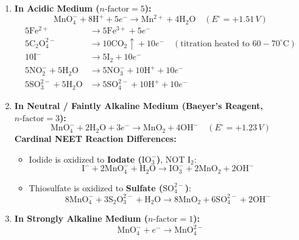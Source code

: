 \documentclass[10pt,twoside,openright]{book}
\begin{document}
\begin{formulabox}
\begin{enumerate}
  \item \textbf{In Acidic Medium ($n\text{-factor} = 5$):}
  \begin{equation}
    \mathrm{MnO_4^-} + 8\mathrm{H^+} + 5e^- \longrightarrow \mathrm{Mn^{2+}} + 4\mathrm{H_2O} \quad (E^\circ = +1.51\,\si{V})
  \end{equation}
  \begin{align}
    5\mathrm{Fe^{2+}} &\longrightarrow 5\mathrm{Fe^{3+}} + 5e^- \\
    5\mathrm{C_2O_4^{2-}} &\longrightarrow 10\mathrm{CO_2\uparrow} + 10e^- \quad (\text{titration heated to } 60-70^\circ\text{C}) \\
    10\mathrm{I^-} &\longrightarrow 5\mathrm{I_2} + 10e^- \\
    5\mathrm{NO_2^-} + 5\mathrm{H_2O} &\longrightarrow 5\mathrm{NO_3^-} + 10\mathrm{H^+} + 10e^- \\
    5\mathrm{SO_3^{2-}} + 5\mathrm{H_2O} &\longrightarrow 5\mathrm{SO_4^{2-}} + 10\mathrm{H^+} + 10e^-
  \end{align}
  \item \textbf{In Neutral / Faintly Alkaline Medium (Baeyer's Reagent, $n\text{-factor} = 3$):}
  \begin{equation}
    \mathrm{MnO_4^-} + 2\mathrm{H_2O} + 3e^- \longrightarrow \mathbf{\mathrm{MnO_2}} + 4\mathrm{OH^-} \quad (E^\circ = +1.23\,\si{V})
  \end{equation}
  \textbf{Cardinal NEET Reaction Differences:}
  \begin{itemize}
    \item Iodide is oxidized to \textbf{Iodate ($\mathrm{IO_3^-}$)}, NOT $\mathrm{I_2}$:
    \begin{equation}
      \mathrm{I^-} + 2\mathrm{MnO_4^-} + \mathrm{H_2O} \longrightarrow \mathbf{\mathrm{IO_3^-}} + 2\mathrm{MnO_2} + 2\mathrm{OH^-}
    \end{equation}
    \item Thiosulfate is oxidized to \textbf{Sulfate ($\mathrm{SO_4^{2-}}$)}:
    \begin{equation}
      8\mathrm{MnO_4^-} + 3\mathrm{S_2O_3^{2-}} + \mathrm{H_2O} \longrightarrow 8\mathrm{MnO_2} + 6\mathrm{SO_4^{2-}} + 2\mathrm{OH^-}
    \end{equation}
  \end{itemize}
  \item \textbf{In Strongly Alkaline Medium ($n\text{-factor} = 1$):}
  \begin{equation}
    \mathrm{MnO_4^-} + e^- \longrightarrow \mathrm{MnO_4^{2-}}
  \end{equation}
\end{enumerate}
\end{formulabox}
\end{document}
